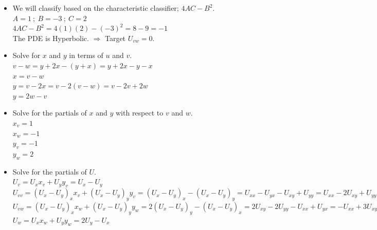 \documentclass[10pt]{article}
\begin{document}
\begin{itemize}
    \item We will classify based on the characteristic classifier; $ \displaystyle 4AC - B^2 $. \\
    \subitem $ \displaystyle A = 1 \ ; \ B = -3 \ ; \ C = 2 $ \\
    \subitem $ \displaystyle 4AC - B^2 = 4(1)(2) - (-3)^2 = 8 - 9 = -1 $ \\
    \subitem The PDE is Hyperbolic. $ \Rightarrow $ Target $ U_{vw} = 0 $. \\
    \item Solve for $ \displaystyle x $ and $ \displaystyle y $ in terms of $ \displaystyle u $ and $ \displaystyle v $. \\
    \subitem $ \displaystyle v - w = y + 2x -(y + x) = y + 2x - y - x $ \\
    \subsubitem $ \displaystyle x = v - w $ \\
    \subitem $ \displaystyle y = v - 2x = v - 2(v - w) = v - 2v + 2w $ \\
    \subsubitem $ \displaystyle y = 2w - v $ \\
    \item Solve for the partials of $ \displaystyle x $ and $ \displaystyle y $ with respect to $ \displaystyle v $ and $ \displaystyle w $. \\
    \subitem $ \displaystyle x_{v} = 1 $ \\
    \subitem $ \displaystyle x_{w} = -1 $ \\
    \subitem $ \displaystyle y_{v} = -1 $ \\
    \subitem $ \displaystyle y_{w} = 2 $ \\
    \item Solve for the partials of $ \displaystyle U $. \\
    \subitem $ \displaystyle U_{v} = U_{x}x_{v} + U_{y}y_{v} = U_{x} - U_{y} $ \\
    \subitem $ \displaystyle U_{vv} = (U_{x} - U_{y})_{x}x_{v} + (U_{x} - U_{y})_{y}y_{v} = (U_{x} - U_{y})_{x} - (U_{x} - U_{y})_{y} = U_{xx} - U_{yx} - U_{xy} + U_{yy} = U_{xx} - 2U_{xy} + U_{yy} $ \\
    \subitem $ \displaystyle U_{vw} = (U_{x} - U_{y})_{x}x_{w} + (U_{x} - U_{y})_{y}y_{w} =  2(U_{x} - U_{y})_{y} - (U_{x} - U_{y})_{x} = 2U_{xy} - 2U_{yy} - U_{xx} + U_{yx} = -U_{xx} + 3U_{xy} - 2U_{yy} $ \\
    \subitem $ \displaystyle U_{w} = U_{x}x_{w} + U_{y}y_{w} = 2U_{y} - U_{x} $ \\

\end{itemize}
\end{document}
